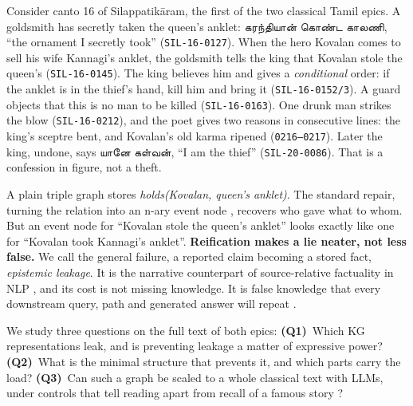 \documentclass[11pt]{article}
\newcommand{\ta}[1]{{\tamilfont #1}}
\newcommand{\lid}[1]{\texttt{\small #1}}
\begin{document}
Consider canto 16 of Silappatik\={a}ram, the first of the two classical Tamil epics. A goldsmith has secretly taken the queen's anklet: \ta{கரந்தியான் கொண்ட காலணி}, ``the ornament I secretly took'' (\lid{SIL-16-0127}). When the hero Kovalan comes to sell his wife Kannagi's anklet, the goldsmith tells the king that Kovalan stole the queen's (\lid{SIL-16-0145}). The king believes him and gives a \emph{conditional} order: if the anklet is in the thief's hand, kill him and bring it (\lid{SIL-16-0152/3}). A guard objects that this is no man to be killed (\lid{SIL-16-0163}). One drunk man strikes the blow (\lid{SIL-16-0212}), and the poet gives two reasons in consecutive lines: the king's sceptre bent, and Kovalan's old karma ripened (\lid{0216--0217}). Later the king, undone, says \ta{யானே கள்வன்}, ``I am the thief'' (\lid{SIL-20-0086}). That is a confession in figure, not a theft.

A plain triple graph stores \emph{holds(Kovalan, queen's anklet)}. The standard repair, turning the relation into an n-ary event node \citep{Noy2006NaryRelations}, recovers who gave what to whom. But an event node for ``Kovalan stole the queen's anklet'' looks exactly like one for ``Kovalan took Kannagi's anklet''. \textbf{Reification makes a lie neater, not less false.} We call the general failure, a reported claim becoming a stored fact, \emph{epistemic leakage}. It is the narrative counterpart of source-relative factuality in NLP \citep{Sauri2009Factbank,Marneffe2012DidIt,Diab2009CommittedBelief}, and its cost is not missing knowledge. It is false knowledge that every downstream query, path and generated answer will repeat \citep{Ji2023SurveyHallucination}.

We study three questions on the full text of both epics:
\textbf{(Q1)}~Which KG representations leak, and is preventing leakage a matter of expressive power?
\textbf{(Q2)}~What is the minimal structure that prevents it, and which parts carry the load?
\textbf{(Q3)}~Can such a graph be scaled to a whole classical text with LLMs, under controls that tell reading apart from recall of a famous story \citep{Chang2023SpeakMemory}?
\end{document}
